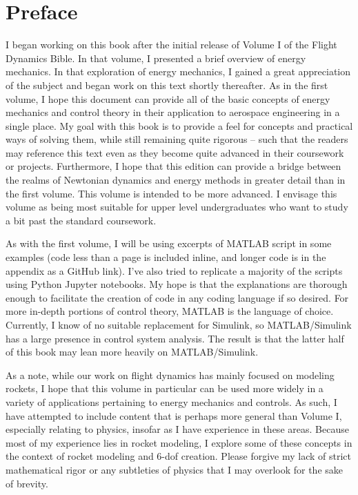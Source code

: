 \chapter*{Preface}\label{sec:preface}
I began working on this book after the initial release of Volume I of the Flight Dynamics Bible. In that volume, I presented a brief overview of energy mechanics. In that exploration of energy mechanics, I gained a great appreciation of the subject and began work on this text shortly thereafter. As in the first volume, I hope this document can provide all of the basic concepts of energy mechanics and control theory in their application to aerospace engineering in a single place. My goal with this book is to provide a feel for concepts and practical ways of solving them, while still remaining quite rigorous -- such that the readers may reference this text even as they become quite advanced in their coursework or projects. Furthermore, I hope that this edition can provide a bridge between the realms of Newtonian dynamics and energy methods in greater detail than in the first volume. This volume is intended to be more advanced. I envisage this volume as being most suitable for upper level undergraduates who want to study a bit past the standard coursework.

As with the first volume, I will be using excerpts of MATLAB script in some examples (code less than a page is included inline, and longer code is in the appendix as a GitHub link). I've also tried to replicate a majority of the scripts using Python Jupyter notebooks. My hope is that the explanations are thorough enough to facilitate the creation of code in any coding language if so desired. For more in-depth portions of control theory, MATLAB is the language of choice. Currently, I know of no suitable replacement for Simulink, so MATLAB/Simulink has a large presence in control system analysis. The result is that the latter half of this book may lean more heavily on MATLAB/Simulink.

As a note, while our work on flight dynamics has mainly focused on modeling rockets, I hope that this volume in particular can be used more widely in a variety of applications pertaining to energy mechanics and controls. As such, I have attempted to include content that is perhaps more general than Volume I, especially relating to physics, insofar as I have experience in these areas. Because most of my experience lies in rocket modeling, I explore some of these concepts in the context of rocket modeling and 6-\gls{dof} creation. Please forgive my lack of strict mathematical rigor or any subtleties of physics that I may overlook for the sake of brevity.


